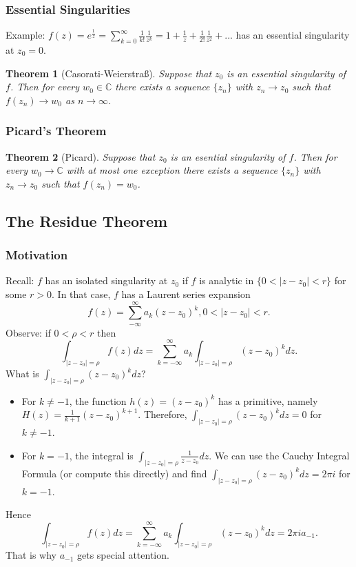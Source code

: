 \documentclass{article}
\newtheorem{theorem}{Theorem}[section]
\begin{document}
\subsubsection{Essential Singularities}
Example: $f(z) = e^{\frac{1}{z}} = \sum_{k=0}^{\infty} \frac{1}{k!} \frac{1}{z^k} = 1 + \frac{1}{z} + \frac{1}{2!} \frac{1}{z^2} + ...$ has an essential singularity at $z_0 = 0$.
\begin{theorem}[Casorati-Weierstraß]
Suppose that $z_0$ is an essential singularity of $f$. Then for every $w_0 \in \mathbb{C}$ there exists a sequence $\{ z_n \}$ with $z_n \to z_0$ such that $f(z_n) \to w_0$ as $n \to \infty$.
\end{theorem}

\subsubsection{Picard's Theorem}
\begin{theorem}[Picard]
Suppose that $z_0$ is an esential singularity of $f$. Then for every $w_0 \to \mathbb{C}$ with at most one exception there exists a sequence $\{ z_n \}$ with $z_n \to z_0$ such that $f(z_n) = w_0$.
\end{theorem}

\subsection{The Residue Theorem}

\subsubsection{Motivation}
Recall: $f$ has an isolated singularity at $z_0$ if $f$ is analytic in $\{ 0 < \left|z - z_0\right| < r \}$ for some $r > 0$. In that case, $f$ has a Laurent series expansion
\begin{equation*}
f(z) = \sum_{-\infty}^{\infty} a_k(z - z_0)^k, 0 < \left| z - z_0\right| < r.
\end{equation*}
Observe: if $0 < \rho < r$ then
\begin{equation*}
\int_{\left|z - z_0\right| = \rho} f(z)dz = \sum_{k=-\infty}^{\infty}a_k \int_{\left|z - z_0\right| = \rho} (z - z_0)^k dz.
\end{equation*}
What is $\int_{\left|z - z_0\right| = \rho} (z - z_0)^k dz$?
\begin{itemize}
\item For $k \neq -1$, the function $h(z) = (z - z_0)^k$ has a primitive, namely $H(z) = \frac{1}{k+1}(z - z_0)^{k+1}$. Therefore, $\int_{\left|z - z_0\right| = \rho} (z - z_0)^k dz = 0$ for $k \neq -1$.
\item For $k = -1$, the integral is $\int_{\left|z - z_0\right| = \rho} \frac{1}{z - z_0}dz$. We can use the Cauchy Integral Formula (or compute this directly) and find $\int_{\left|z - z_0\right| = \rho} (z - z_0)^k dz = 2\pi i$ for $k = -1$.
\end{itemize}
Hence 
\begin{equation*}
\int_{\left|z - z_0\right| = \rho} f(z)dz = \sum_{k=-\infty}^{\infty}a_k\int_{\left|z - z_0\right| = \rho}(z - z_0)^kdz = 2\pi i a_{-1}.
\end{equation*}
That is why $a_{-1}$ gets special attention.
\end{document}
